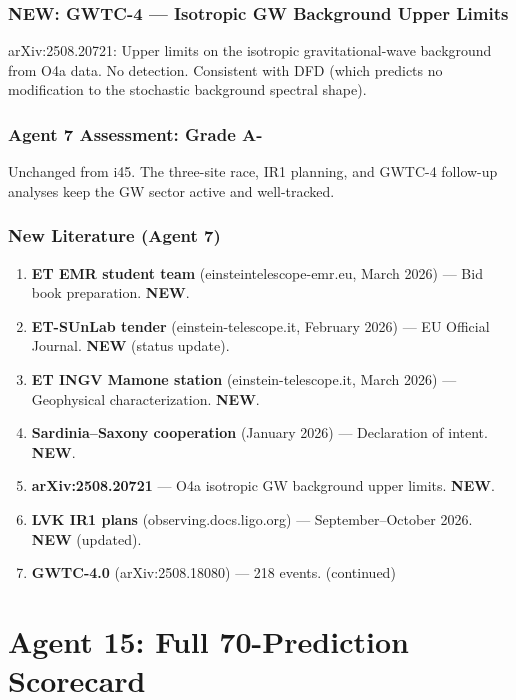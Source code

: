 \documentclass[11pt,a4paper]{article}
\newcommand{\NEW}{\textcolor{dfdblue}{\textbf{NEW}}}
\begin{document}
\section{\NEW: GWTC-4 --- Isotropic GW Background Upper Limits}

arXiv:2508.20721: Upper limits on the isotropic gravitational-wave background from O4a data. No detection. Consistent with DFD (which predicts no modification to the stochastic background spectral shape).

\section{Agent 7 Assessment: Grade A-}

Unchanged from i45. The three-site race, IR1 planning, and GWTC-4 follow-up analyses keep the GW sector active and well-tracked.

\section{New Literature (Agent 7)}

\begin{enumerate}
\item \textbf{ET EMR student team} (einsteintelescope-emr.eu, March 2026) --- Bid book preparation. \NEW.
\item \textbf{ET-SUnLab tender} (einstein-telescope.it, February 2026) --- EU Official Journal. \NEW{} (status update).
\item \textbf{ET INGV Mamone station} (einstein-telescope.it, March 2026) --- Geophysical characterization. \NEW.
\item \textbf{Sardinia--Saxony cooperation} (January 2026) --- Declaration of intent. \NEW.
\item \textbf{arXiv:2508.20721} --- O4a isotropic GW background upper limits. \NEW.
\item \textbf{LVK IR1 plans} (observing.docs.ligo.org) --- September--October 2026. \NEW{} (updated).
\item \textbf{GWTC-4.0} (arXiv:2508.18080) --- 218 events. (continued)
\end{enumerate}


\part{Agent 15: Full 70-Prediction Scorecard}
\label{part:agent15}
\end{document}
